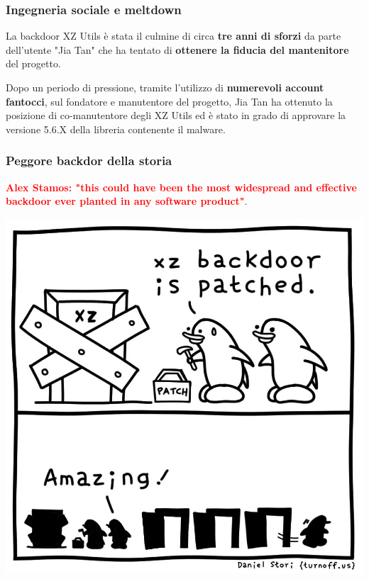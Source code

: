 \begin{frame}
\frametitle{Ingegneria sociale e meltdown}
La backdoor XZ Utils è stata il culmine di circa \textbf{tre anni di sforzi} da parte dell'utente "Jia Tan" che ha tentato di \textbf{ottenere la fiducia del mantenitore} del progetto.

\vspace{0.5 cm}

Dopo un periodo di pressione, tramite l'utilizzo di \textbf{numerevoli account fantocci}, sul fondatore e manutentore del progetto, Jia Tan ha ottenuto la posizione di co-manutentore degli XZ Utils ed è stato in grado di approvare la versione 5.6.X della libreria contenente il malware.

\end{frame}

\begin{frame}
    \frametitle{Peggore backdor della storia}
    \textbf{\textcolor{red}{Alex Stamos: "this could have been the most widespread and effective backdoor ever planted in any software product"}}.

    \begin{center}
        \includegraphics[width=0.4\linewidth]{img/2-Introduction/xz-backdoor-patched.jpeg}
    \end{center}
\vspace{0.5 cm}

\end{frame}